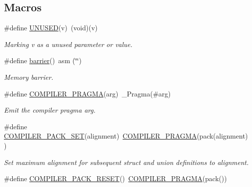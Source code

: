 \subsection*{Macros}
\begin{DoxyCompactItemize}
\item 
\hypertarget{group__group__sam0__utils_gada67c62b1c57e07efa04431bc40b9238}{}\#define \hyperlink{group__group__sam0__utils_gada67c62b1c57e07efa04431bc40b9238}{U\+N\+U\+S\+E\+D}(v)~(void)(v)\label{group__group__sam0__utils_gada67c62b1c57e07efa04431bc40b9238}

\begin{DoxyCompactList}\small\item\em Marking {\itshape v} as a unused parameter or value. \end{DoxyCompactList}\item 
\hypertarget{group__group__sam0__utils_ga53290ac2df2384738b8769c76622f803}{}\#define \hyperlink{group__group__sam0__utils_ga53290ac2df2384738b8769c76622f803}{barrier}()~asm (\char`\"{}\char`\"{})\label{group__group__sam0__utils_ga53290ac2df2384738b8769c76622f803}

\begin{DoxyCompactList}\small\item\em Memory barrier. \end{DoxyCompactList}\item 
\#define \hyperlink{group__group__sam0__utils_ga85a3ab5701281268521f109ed0078668}{C\+O\+M\+P\+I\+L\+E\+R\+\_\+\+P\+R\+A\+G\+M\+A}(arg)~\+\_\+\+Pragma(\#arg)
\begin{DoxyCompactList}\small\item\em Emit the compiler pragma {\itshape arg}. \end{DoxyCompactList}\item 
\hypertarget{group__group__sam0__utils_gae2c02ff865ca6538b4b1bddbf2a6876c}{}\#define \hyperlink{group__group__sam0__utils_gae2c02ff865ca6538b4b1bddbf2a6876c}{C\+O\+M\+P\+I\+L\+E\+R\+\_\+\+P\+A\+C\+K\+\_\+\+S\+E\+T}(alignment)~\hyperlink{group__group__sam0__utils_ga85a3ab5701281268521f109ed0078668}{C\+O\+M\+P\+I\+L\+E\+R\+\_\+\+P\+R\+A\+G\+M\+A}(pack(alignment))\label{group__group__sam0__utils_gae2c02ff865ca6538b4b1bddbf2a6876c}

\begin{DoxyCompactList}\small\item\em Set maximum alignment for subsequent struct and union definitions to {\itshape alignment}. \end{DoxyCompactList}\item 
\hypertarget{group__group__sam0__utils_ga38d28b622a4bc7b0f3fb2be2ef1e0086}{}\#define \hyperlink{group__group__sam0__utils_ga38d28b622a4bc7b0f3fb2be2ef1e0086}{C\+O\+M\+P\+I\+L\+E\+R\+\_\+\+P\+A\+C\+K\+\_\+\+R\+E\+S\+E\+T}()~\hyperlink{group__group__sam0__utils_ga85a3ab5701281268521f109ed0078668}{C\+O\+M\+P\+I\+L\+E\+R\+\_\+\+P\+R\+A\+G\+M\+A}(pack())\label{group__group__sam0__utils_ga38d28b622a4bc7b0f3fb2be2ef1e0086}


\end{DoxyCompactItemize}
